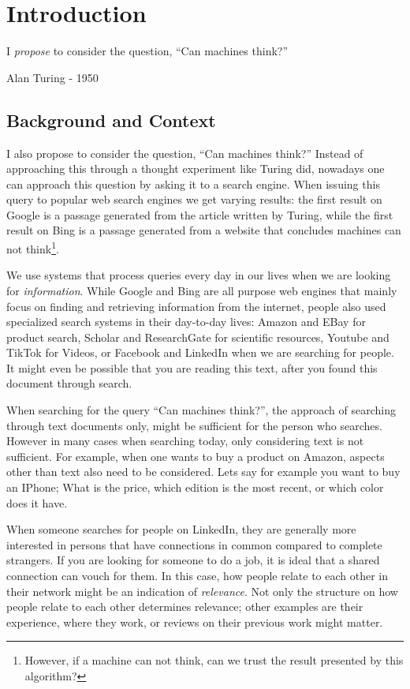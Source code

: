 \chapter{Introduction}
\epigraph{I \textit{propose} to consider the question, ``Can machines think?''}{Alan Turing - 1950}

\section{Background and Context}
I also propose to consider the question, ``Can machines think?'' Instead of approaching this through a thought experiment like Turing did, nowadays one can approach this question by asking it to a search engine. When issuing this query to popular web search engines we get varying results: the first result on Google is a passage generated from the article written by Turing, while the first result on Bing is a passage generated from a website that concludes machines can not think\footnote{However, if a machine can not think, can we trust the result presented by this algorithm?}.

We use systems that process queries every day in our lives when we are looking for \textit{information}. While Google and Bing are all purpose web engines that mainly focus on finding and retrieving information from the internet, people also used specialized search systems in their day-to-day lives: Amazon and EBay for product search, Scholar and ResearchGate for scientific resources, Youtube and TikTok for Videos, or Facebook and LinkedIn when we are searching for people. It might even be possible that you are reading this text, after you found this document through search. 

When searching for the query ``Can machines think?'', the approach of searching through text documents only, might be sufficient for the person who searches. However in many cases when searching today, only considering text is not sufficient. For example, when one wants to buy a product on Amazon, aspects other than text also need to be considered. Lets say for example you want to buy an IPhone; What is the price, which edition is the most recent, or which color does it have.

When someone searches for people on LinkedIn, they are generally more interested in persons that have connections in common compared to complete strangers. If you are looking for someone to do a job, it is ideal that a shared connection can vouch for them. In this case, how people relate to each other in their network might be an indication of \textit{relevance}. Not only the structure on how people relate to each other determines relevance; other examples are their experience, where they work, or reviews on their previous work might matter.

